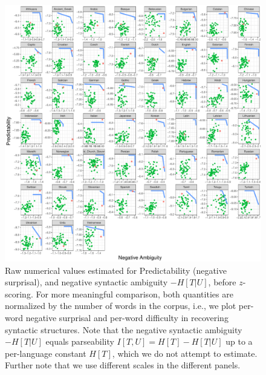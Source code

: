 \documentclass[10pt,twoside,lineno]{article}
\begin{document}
\begin{figure}
\centering
\includegraphics[width=\textwidth]{../results/plane/pareto-plane-perLanguage-raw.pdf}
	\caption[Predictability and Parseability]{Raw numerical values estimated for Predictability (negative surprisal), and negative syntactic ambiguity $-H[T|U]$, before $z$-scoring. For more meaningful comparison, both quantities are normalized by the number of words in the corpus, i.e., we plot per-word negative surprisal and per-word difficulty in recovering syntactic structures.  Note that the negative syntactic ambiguity $-H[T|U]$ equals parseability $I[T,U] = H[T] - H[T|U]$ up to a per-language constant $H[T]$, which we do not attempt to estimate. Further note that we use different scales in the different panels. }\label{fig:pareto-per-lang-raw}
\end{figure}
\end{document}

